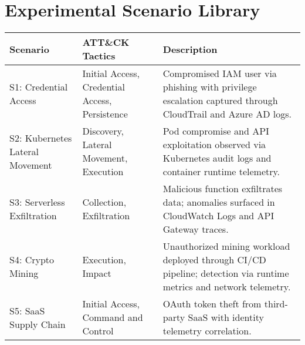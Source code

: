 \chapter{Experimental Scenario Library}\label{app:matrix}
\begin{longtable}{p{3cm}p{4cm}p{7cm}}
\toprule
Scenario & ATT\&CK Tactics & Description \\
\midrule
S1: Credential Access & Initial Access, Credential Access, Persistence & Compromised IAM user via phishing with privilege escalation captured through CloudTrail and Azure AD logs. \\
S2: Kubernetes Lateral Movement & Discovery, Lateral Movement, Execution & Pod compromise and API exploitation observed via Kubernetes audit logs and container runtime telemetry. \\
S3: Serverless Exfiltration & Collection, Exfiltration & Malicious function exfiltrates data; anomalies surfaced in CloudWatch Logs and API Gateway traces. \\
S4: Crypto Mining & Execution, Impact & Unauthorized mining workload deployed through CI/CD pipeline; detection via runtime metrics and network telemetry. \\
S5: SaaS Supply Chain & Initial Access, Command and Control & OAuth token theft from third-party SaaS with identity telemetry correlation. \\
\bottomrule
\end{longtable}
